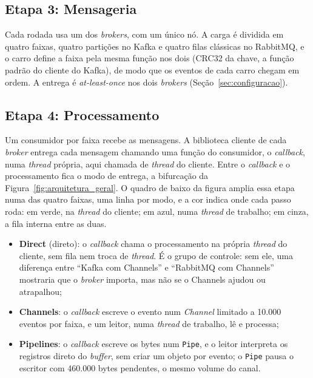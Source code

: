 \documentclass[12pt]{article}
\begin{document}
\subsection{Etapa 3: Mensageria}
\label{sec:mensageria}

Cada rodada usa um dos \textit{brokers}, com um único nó. A carga é dividida em quatro faixas,
quatro partições no Kafka e quatro filas clássicas no RabbitMQ, e o carro define a faixa
pela mesma função nos dois (CRC32 da chave, a função padrão do cliente do Kafka), de modo
que os eventos de cada carro chegam em ordem. A entrega é \textit{at-least-once} nos dois
\textit{brokers} (Seção~\ref{sec:configuracao}).

\subsection{Etapa 4: Processamento}
\label{sec:processamento}

Um consumidor por faixa recebe as mensagens. A biblioteca cliente de cada \textit{broker} entrega
cada mensagem chamando uma função do consumidor, o \textit{callback}, numa \textit{thread} própria,
aqui chamada de \textit{thread} do cliente. Entre o \textit{callback} e o processamento fica o modo de
entrega, a bifurcação da Figura~\ref{fig:arquitetura_geral}. O quadro de baixo da
figura amplia essa etapa numa das quatro faixas, uma linha por modo, e a cor indica onde
cada passo roda: em verde, na \textit{thread} do cliente; em azul, numa \textit{thread} de trabalho; em
cinza, a fila interna entre as duas.

\begin{itemize}
  \item \textbf{Direct} (direto): o \textit{callback} chama o processamento na própria \textit{thread} do
        cliente, sem fila nem troca de \textit{thread}. É o grupo de controle: sem ele, uma
        diferença entre ``Kafka com Channels'' e ``RabbitMQ com Channels'' mostraria que
        o \textit{broker} importa, mas não se o Channels ajudou ou atrapalhou;
  \item \textbf{Channels}: o \textit{callback} escreve o evento num \textit{Channel} limitado a
        10.000 eventos por faixa, e um leitor, numa \textit{thread} de trabalho, lê e processa;
  \item \textbf{Pipelines}: o \textit{callback} escreve os bytes num \texttt{Pipe}, e o leitor
        interpreta os registros direto do \textit{buffer}, sem criar um objeto por evento; o
        \texttt{Pipe} pausa o escritor com 460.000 bytes pendentes, o mesmo volume do
        canal.
\end{itemize}
\end{document}
